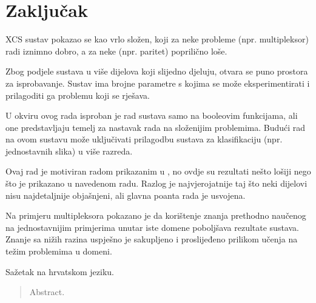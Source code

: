 \documentclass[times, utf8, zavrsni]{fer}
\begin{document}
\chapter{Zaključak}
XCS sustav pokazao se kao vrlo složen, koji za neke probleme (npr. multipleksor) radi iznimno dobro, a za neke (npr. paritet) poprilično loše.

Zbog podjele sustava u više dijelova koji slijedno djeluju, otvara se puno prostora za isprobavanje.
Sustav ima brojne parametre s kojima se može eksperimentirati i prilagoditi ga problemu koji se rješava.

U okviru ovog rada isproban je rad sustava samo na booleovim funkcijama, ali one predstavljaju temelj za nastavak rada na složenijim problemima.
Budući rad na ovom sustavu može uključivati prilagodbu sustava za klasifikaciju (npr. jednostavnih slika) u više razreda.

Ovaj rad je motiviran radom prikazanim u \citep{4}, no ovdje su rezultati nešto lošiji nego što je prikazano u navedenom radu.
Razlog je najvjerojatnije taj što neki dijelovi nisu najdetaljnije objašnjeni, ali glavna poanta rada je usvojena.

Na primjeru multipleksora pokazano je da korištenje znanja prethodno naučenog na jednostavnijim primjerima unutar iste domene poboljšava rezultate sustava.
Znanje sa nižih razina uspješno je sakupljeno i proslijeđeno prilikom učenja na težim problemima u domeni.




\begin{sazetak}
Sažetak na hrvatskom jeziku.

\end{sazetak}

\begin{abstract}
Abstract.

\end{abstract}
\end{document}
